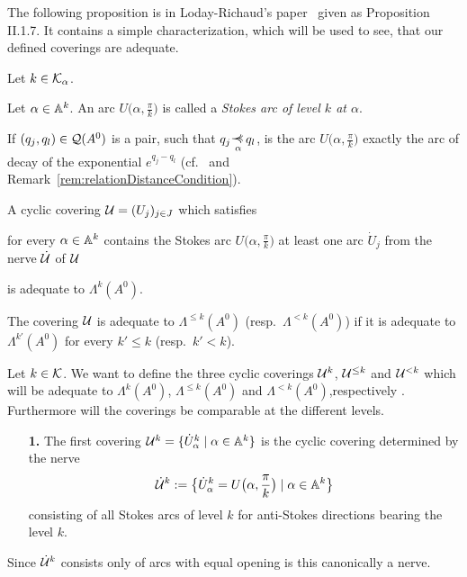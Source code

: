 The following proposition is in Loday-Richaud's paper~\cite{Loday1994} given as
Proposition II.1.7. It contains a simple characterization, which will be used
to see, that our defined coverings are adequate.
\begin{prop}\label{prop:adeqCovCondition}
  Let $k\in\mathcal{K}_\alpha$.
  \begin{s-defn}
    Let $\alpha\in\mathbb{A}^k$.
    An arc $U\bigl(\alpha,\frac{\pi}{k}\bigr)$ is called a \emph{Stokes arc of
      level $k$ at $\alpha$}.

    If $(q_j,q_l)\in\mathcal{Q}(A^0)$ is a pair, such that $q_j\myrel{\alpha}q_l$, is
    the arc $U\bigl(\alpha,\frac{\pi}{k}\bigr)$ exactly the arc of decay of the
    exponential $e^{q_j-q_l}$ (cf.~\cite[5269]{Loday2004} and
    Remark~\ref{rem:relationDistanceCondition}).
  \end{s-defn}
  A cyclic covering $\mathcal{U}=(U_j)_{j\in J}$ which satisfies
  \begin{einr}
    for every $\alpha\in\mathbb{A}^k$ contains the Stokes arc
    $U\bigl(\alpha,\frac{\pi}{k}\bigr)$ at least one arc $\dot U_j$ from the
    nerve $\dot{\mathcal{U}}$ of $\mathcal{U}$
  \end{einr}
  is adequate to $\Lambda^k(A^0)$.

  The covering $\mathcal{U}$ is adequate to $\Lambda^{\leq k}(A^0)$ (resp.\
  $\Lambda^{<k}(A^0)$) if it is adequate to $\Lambda^{k'}(A^0)$ for every
  $k'\leq k$ (resp.\ $k'<k$).
\end{prop}
\begin{comment}
  \begin{proof}
    Show that for every $U_j,U_l\in\cU$ is
    \[
      H^1(U_j\cap U_l;\Lambda^k(A^0))=0 \,.
    \]
    Then the theorem of Leray implies that
    $H^1(S^0;\Lambda^k(A^0))=H^1(\cU;\Lambda^k(A^0))$
  \end{proof}
\end{comment}

Let $k\in\mathcal{K}$.
We want to define the three cyclic coverings $\mathcal{U}^{k}$, $\mathcal{U}^{\leq k}$ and
$\mathcal{U}^{<k}$ which will be adequate to $\Lambda^k(A^0)$, $\Lambda^{\leq k}(A^0)$
and $\Lambda^{<k}(A^0)$,respectively . Furthermore will the coverings be
comparable at the different levels.

\begin{itemize}
\item[\textbf{1.}] The first covering
  $\mathcal{U}^{k}=\{\dot U_\alpha^k\mid\alpha\in\mathbb{A}^k\}$ is the cyclic covering
  determined by the nerve
  \[
    \dot{\mathcal{U}}^k:=
    \bigl\{\dot U_\alpha^k=U\bigl(\alpha,\frac{\pi}{k}\bigr)\mid\alpha\in\mathbb{A}^k\bigr\}
  \]
  consisting of all Stokes arcs of level $k$ for anti-Stokes directions bearing
  the level $k$.
\end{itemize}
Since $\dot{\mathcal{U}}^k$ consists only of arcs with equal opening is this canonically a
nerve.

